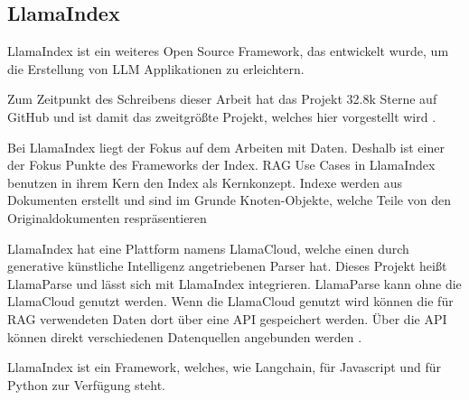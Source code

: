 \subsection{LlamaIndex}
LlamaIndex ist ein weiteres Open Source Framework, das entwickelt wurde, um die Erstellung 
von LLM Applikationen zu erleichtern. \par
Zum Zeitpunkt des Schreibens dieser Arbeit hat das Projekt 32.8k Sterne auf GitHub und ist
damit das zweitgrößte Projekt, welches hier vorgestellt wird \cite{liuLlamaIndex2022}. \par
Bei LlamaIndex liegt der Fokus auf dem Arbeiten mit Daten. Deshalb ist einer der Fokus 
Punkte des Frameworks der Index. RAG Use Cases in LlamaIndex benutzen in ihrem Kern 
den Index als Kernkonzept. Indexe werden aus Dokumenten erstellt und sind im Grunde 
Knoten-Objekte, welche Teile von den Originaldokumenten respräsentieren \cite{IndexingEmbeddingLlamaIndex, LlamaIndexLlamaIndex}\par
LlamaIndex hat eine Plattform namens LlamaCloud, welche einen durch generative 
künstliche Intelligenz angetriebenen Parser hat. Dieses Projekt heißt 
LlamaParse und lässt sich mit LlamaIndex integrieren. LlamaParse kann ohne 
die LlamaCloud genutzt werden. Wenn die LlamaCloud genutzt wird können die für 
RAG verwendeten Daten dort über eine API gespeichert werden. Über die API können direkt 
verschiedenen Datenquellen angebunden werden \cite{LlamaCloudLlamaIndex,IntroducingLlamaCloudLlamaParse}.\par
LlamaIndex ist ein Framework, welches, wie Langchain, für Javascript und für Python zur Verfügung steht\cite{liuLlamaIndex2022}.

